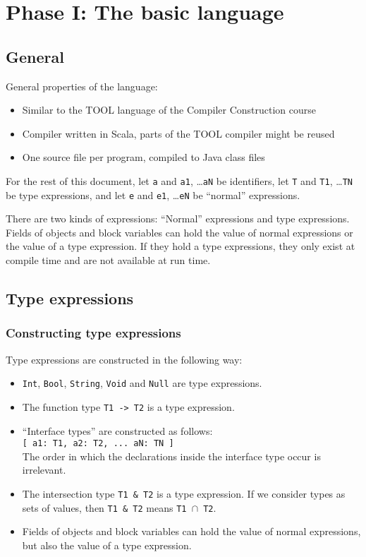 \documentclass[12pt, draft]{article}
\begin{document}
\newpage

\section{Phase I: The basic language}

\subsection{General}

General properties of the language:

\begin{itemize}
\item Similar to the TOOL language of the Compiler Construction course
\item Compiler written in Scala, parts of the TOOL compiler might be reused
\item One source file per program, compiled to Java class files
\end{itemize}

For the rest of this document, let \texttt{a} and \texttt{a1}, \dots \texttt{aN} be identifiers, let \texttt{T} and \texttt{T1}, \dots \texttt{TN} be type expressions, and let \texttt{e} and \texttt{e1}, \dots \texttt{eN} be ``normal'' expressions.

There are two kinds of expressions: ``Normal'' expressions and type expressions. Fields of objects and block variables can hold the value of normal expressions or the value of a type expression. If they hold a type expressions, they only exist at compile time and are not available at run time.


\subsection{Type expressions}

\subsubsection{Constructing type expressions}

Type expressions are constructed in the following way:

\begin{itemize}
\item \texttt{Int}, \texttt{Bool}, \texttt{String}, \texttt{Void} and \texttt{Null} are type expressions.
\item The function type \texttt{T1 -> T2} is a type expression.
\item ``Interface types'' are constructed as follows:\\
        \texttt{[ a1: T1, a2: T2, ... aN: TN ]} \\
        The order in which the declarations inside the interface type occur is irrelevant.
\item The intersection type \texttt{T1 \& T2} is a type expression. If we consider types as sets of values, then \texttt{T1 \& T2} means \texttt{T1 $\cap$ T2}.
\item Fields of objects and block variables can hold the value of normal expressions, but also the value of a type expression. 
\end{itemize}
\end{document}

